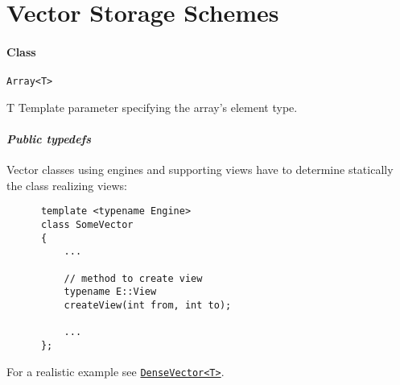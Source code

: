 \section{Vector Storage Schemes}


  \paragraph{Class}{\tt \hypertarget{Array}{Array<T>}}


  \begin{CDescription}
  \item[T]
      Template parameter specifying the array's element type.
  \end{CDescription}

  \paragraph{{\it Public typedefs}}
  \hypertarget{Array:typedefs}{}
  
  \begin{CDescription}
  \item[typedef ArrayView<T> View;           ,,%
        typedef ConstArrayView<T> ConstView;]
      Vector classes using engines and supporting views have to determine
      statically the class realizing views:
      \begin{lstlisting}
      template <typename Engine>
      class SomeVector
      {
          ...
          
          // method to create view
          typename E::View
          createView(int from, int to);

          ...    
      };
      \end{lstlisting}
      For a realistic example see \hyperlink{DenseVector}{{\tt DenseVector<T>}}.
  \end{CDescription}

